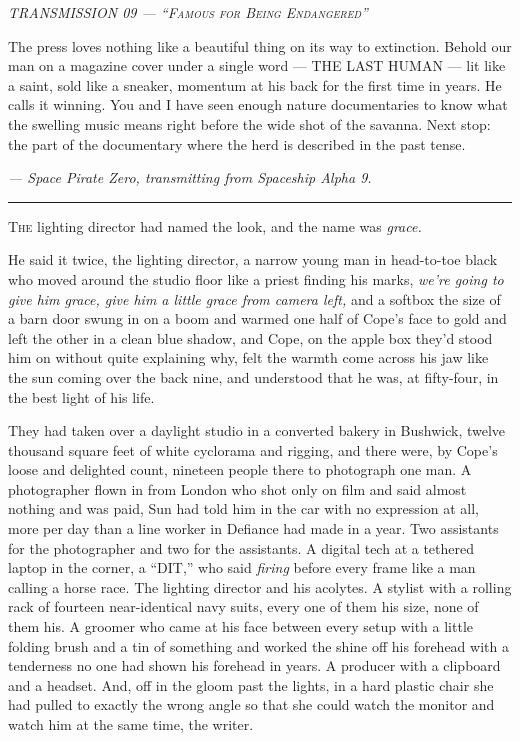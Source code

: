 \documentclass[11pt,openany]{book}
\newcommand{\transheader}{\normalfont\footnotesize\scshape\letterspace}
\newcommand{\letterspace}{}
\newenvironment{transmission}{%
  \par\vspace{0.3\baselineskip}\begin{center}\begin{minipage}{0.88\textwidth}%
  \itshape\small\setlength{\parindent}{0pt}\setstretch{1.06}}%
  {\end{minipage}\end{center}\vspace{0.4\baselineskip}%
  \noindent\hfil\rule{0.35\textwidth}{0.3pt}\hfil\par\vspace{1.0\baselineskip}}
\begin{document}
\begin{transmission}
{\transheader TRANSMISSION 09 --- ``Famous for Being Endangered''}\par\vspace{0.5em}
The press loves nothing like a beautiful thing on its way to extinction. Behold our man on a magazine cover under a single word --- THE LAST HUMAN --- lit like a saint, sold like a sneaker, momentum at his back for the first time in years. He calls it winning. You and I have seen enough nature documentaries to know what the swelling music means right before the wide shot of the savanna. Next stop: the part of the documentary where the herd is described in the past tense.\par
\vspace{0.5em}\hfill\textit{--- Space Pirate Zero, transmitting from Spaceship Alpha 9.}\par
\end{transmission}


\lettrine[lines=3, lhang=0.05, nindent=0.25em]{T}{he} lighting director had named the look, and the name was \textit{grace.}

He said it twice, the lighting director, a narrow young man in head-to-toe black who moved around the studio floor like a priest finding his marks, \textit{we're going to give him grace, give him a little grace from camera left,} and a softbox the size of a barn door swung in on a boom and warmed one half of Cope's face to gold and left the other in a clean blue shadow, and Cope, on the apple box they'd stood him on without quite explaining why, felt the warmth come across his jaw like the sun coming over the back nine, and understood that he was, at fifty-four, in the best light of his life.

They had taken over a daylight studio in a converted bakery in Bushwick, twelve thousand square feet of white cyclorama and rigging, and there were, by Cope's loose and delighted count, nineteen people there to photograph one man. A photographer flown in from London who shot only on film and said almost nothing and was paid, Sun had told him in the car with no expression at all, more per day than a line worker in Defiance had made in a year. Two assistants for the photographer and two for the assistants. A digital tech at a tethered laptop in the corner, a ``DIT,'' who said \textit{firing} before every frame like a man calling a horse race. The lighting director and his acolytes. A stylist with a rolling rack of fourteen near-identical navy suits, every one of them his size, none of them his. A groomer who came at his face between every setup with a little folding brush and a tin of something and worked the shine off his forehead with a tenderness no one had shown his forehead in years. A producer with a clipboard and a headset. And, off in the gloom past the lights, in a hard plastic chair she had pulled to exactly the wrong angle so that she could watch the monitor and watch him at the same time, the writer.
\end{document}
